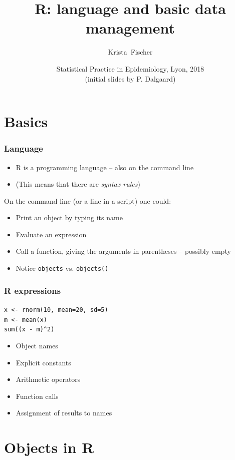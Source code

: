 \documentclass{beamer}
\title{R: language and basic data management}
\author{Krista~Fischer}
\date[Lyon 2018] %
{Statistical Practice in Epidemiology, Lyon, 2018 \\ (initial slides by P. Dalgaard)}
\newcommand{\code}[1]{\texttt{#1}}
\begin{document}
\begin{frame}
  \titlepage
\end{frame}

\section{Basics}

\begin{frame}
  \frametitle{Language}
  \begin{itemize}
  \item R is a programming language -- also on the command line
  \item (This means that there are \emph{syntax rules})
  \end{itemize}
On the command line (or a line in a script) one could:
  \begin{itemize}
  \item Print an object by typing its name
  \item Evaluate an expression 
  \item Call a function, giving the arguments in parentheses -- possibly empty
  \item Notice \code{objects} vs. \code{objects()}
  \end{itemize}
\end{frame}


\begin{frame}
  \frametitle{R expressions}
\texttt{\alert<6>{\alert<2>{x} <-} \alert<5>{rnorm(\alert<3>{10}, mean=\alert<3>{20}, 
 sd=\alert<3>{5})}\\
\alert<6>{\alert<2>{m} <-} \alert<5>{mean(\alert<2>{x})}\\
\alert<5>{sum((\alert<2>{x} \alert<4>{-} \alert<2>{m})\alert<4>{\textasciicircum}\alert<3>{2})}
}\\
\pause
  \begin{itemize}
  \item Object \alert<2>{names}
  \item Explicit \alert<3>{constants}
  \item Arithmetic \alert<4>{operators}
  \item \alert<5>{Function calls}
  \item \alert<6>{Assignment} of results to names
  \end{itemize}
\end{frame}

\section{Objects in R}
\end{document}
